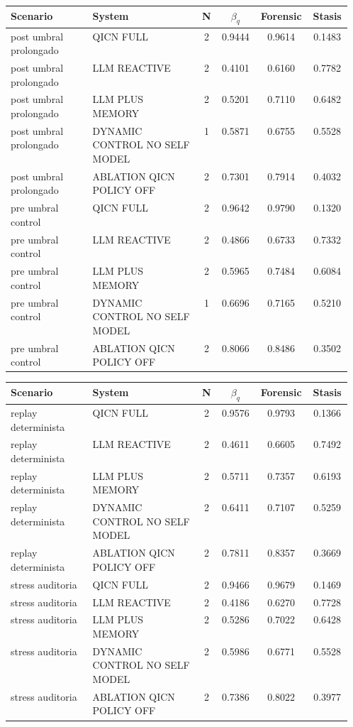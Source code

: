 \documentclass[11pt,a4paper]{article}
\theoremstyle{definition}
\begin{document}
\par\medskip\noindent
\begin{tabular}{>{\raggedright\arraybackslash}p{0.24\linewidth}>{\raggedright\arraybackslash}p{0.32\linewidth}cccc}
\toprule
Scenario & System & N & $\beta_q$ & Forensic & Stasis \\
\midrule
post umbral prolongado & QICN FULL & 2 & 0.9444 & 0.9614 & 0.1483 \\
post umbral prolongado & LLM REACTIVE & 2 & 0.4101 & 0.6160 & 0.7782 \\
post umbral prolongado & LLM PLUS MEMORY & 2 & 0.5201 & 0.7110 & 0.6482 \\
post umbral prolongado & DYNAMIC CONTROL NO SELF MODEL & 1 & 0.5871 & 0.6755 & 0.5528 \\
post umbral prolongado & ABLATION QICN POLICY OFF & 2 & 0.7301 & 0.7914 & 0.4032 \\
pre umbral control & QICN FULL & 2 & 0.9642 & 0.9790 & 0.1320 \\
pre umbral control & LLM REACTIVE & 2 & 0.4866 & 0.6733 & 0.7332 \\
pre umbral control & LLM PLUS MEMORY & 2 & 0.5965 & 0.7484 & 0.6084 \\
pre umbral control & DYNAMIC CONTROL NO SELF MODEL & 1 & 0.6696 & 0.7165 & 0.5210 \\
pre umbral control & ABLATION QICN POLICY OFF & 2 & 0.8066 & 0.8486 & 0.3502 \\
\bottomrule
\end{tabular}
\par\medskip\noindent
\begin{tabular}{>{\raggedright\arraybackslash}p{0.24\linewidth}>{\raggedright\arraybackslash}p{0.32\linewidth}cccc}
\toprule
Scenario & System & N & $\beta_q$ & Forensic & Stasis \\
\midrule
replay determinista & QICN FULL & 2 & 0.9576 & 0.9793 & 0.1366 \\
replay determinista & LLM REACTIVE & 2 & 0.4611 & 0.6605 & 0.7492 \\
replay determinista & LLM PLUS MEMORY & 2 & 0.5711 & 0.7357 & 0.6193 \\
replay determinista & DYNAMIC CONTROL NO SELF MODEL & 2 & 0.6411 & 0.7107 & 0.5259 \\
replay determinista & ABLATION QICN POLICY OFF & 2 & 0.7811 & 0.8357 & 0.3669 \\
stress auditoria & QICN FULL & 2 & 0.9466 & 0.9679 & 0.1469 \\
stress auditoria & LLM REACTIVE & 2 & 0.4186 & 0.6270 & 0.7728 \\
stress auditoria & LLM PLUS MEMORY & 2 & 0.5286 & 0.7022 & 0.6428 \\
stress auditoria & DYNAMIC CONTROL NO SELF MODEL & 2 & 0.5986 & 0.6771 & 0.5528 \\
stress auditoria & ABLATION QICN POLICY OFF & 2 & 0.7386 & 0.8022 & 0.3977 \\
\bottomrule
\end{tabular}
\normalsize
\endgroup
\end{document}
